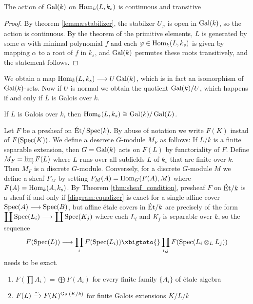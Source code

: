 \begin{proposition}
	The action of $\operatorname{Gal}(k)$ on $\operatorname{Hom}_k(L, k_s)$ is continuous and transitive
\end{proposition}

\begin{proof}
	By theorem \ref{lemma:stabilizer}, the stabilzer $U_\varphi$ is open in $\operatorname{Gal}(k)$, so the action is continuous. By the theorem of the primitive elements, $L$ is generated by some $\alpha$ with minimal polynomial $f$ and each $\varphi \in \operatorname{Hom}_k(L,k_s)$ is given by mapping $\alpha$ to a root of $f$ in $k_s$, and $\operatorname{Gal}(k)$ permutes these roots transitively, and the statement follows.
\end{proof}

We obtain a map $\operatorname{Hom}_k(L,k_s) \longrightarrow U\\ \operatorname{Gal}(k)$, which is in fact an isomorphism of $\operatorname{Gal}(k)$-sets. Now if $U$ is normal we obtain the quotient $\operatorname{Gal}(k)/U$, which happens if and only if $L$ is Galois over $k$.

\begin{corollary}
	If $L$ is Galois over $k$, then $\operatorname{Hom}_k(L,k_s) \cong \operatorname{Gal}(k)/\operatorname{Gal}(L)$.
\end{corollary}

\begin{construction}
	Let $F$ be a presheaf on $\text{\'Et}/\operatorname{Spec}(k)$. By abuse of notation we write $F(K)$ instad of $F(\operatorname{Spec}(K))$. We define a descrete $G$-module $M_F$ as follows: If $L/k$ is a finite separable extension, then $G = \operatorname{Gal}(k)$ acts on $F(L)$ by functoriality of $F$. Define $M_F = \colim F(L)$ where $L$ runs over all subfields $L$ of $k_s$ that are finite over $k$. Then $M_F$ is a discrete $G$-module. Conversely, for a discrete $G$-module $M$ we define a sheaf $F_M$ by setting $F_M(A) = \operatorname{Hom}_G(F(A),M)$ where $F(A) = \operatorname{Hom}_k(A,k_s)$. By Theorem \ref{thm:sheaf_condition}, presheaf $F$ on $\text{\'Et}/k$ is a sheaf if and only if \ref{diagram:equalizer} is exact for a single affine cover $\operatorname{Spec}(A) \longrightarrow \operatorname{Spec}(B)$, but affine \'etale covers in $\text{\'Et}/k$ are precisely of the form $\displaystyle \coprod \operatorname{Spec}(L_i) \longrightarrow \displaystyle \coprod \operatorname{Spec}(K_j)$ where each $L_i$ and $K_j$ is separable over $k$, so the sequence \[ F(\Spec(L)) \to \prod_{i} F(\Spec(L_i)) \xbigtoto{} \prod_{i,j} F(\Spec(L_i \otimes_L L_j)) \] needs to be exact.
\end{construction}

\begin{enumerate}
	\item $F(\prod A_i) = \bigoplus F(A_i)$ for every finite family $\{A_i\}$ of \'etale algebra
	\item $F(L) \xrightarrow{\sim} F(K)^{\operatorname{Gal}(K/k)}$ for finite Galois extensions $K/L/k$
\end{enumerate}

